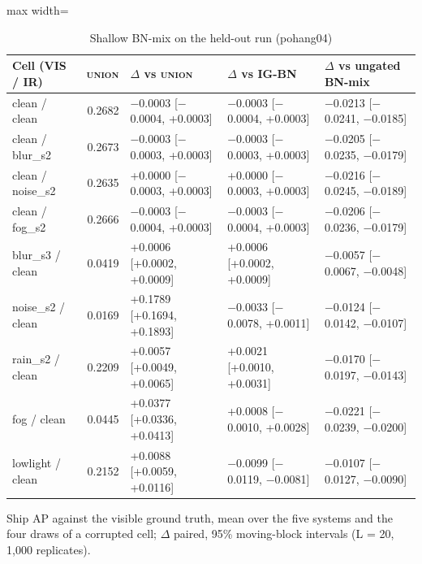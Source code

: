 \documentclass[journal,onecolumn]{IEEEtran}
\begin{document}
\begin{table}[htbp]
\centering
\small
\caption{Shallow BN-mix on the held-out run (pohang04)}
\label{tab:24}
\begin{adjustbox}{max width=\linewidth}
\begin{tabular}{lrlll}
\toprule
Cell (VIS / IR) & \textsc{union} & $\Delta$ vs \textsc{union} & $\Delta$ vs \mbox{IG-BN} & $\Delta$ vs ungated BN-mix \\
\midrule
clean / clean & 0.2682 & $-$0.0003 [$-$0.0004, +0.0003] & $-$0.0003 [$-$0.0004, +0.0003] & $-$0.0213 [$-$0.0241, $-$0.0185] \\
clean / blur\_s2 & 0.2673 & $-$0.0003 [$-$0.0003, +0.0003] & $-$0.0003 [$-$0.0003, +0.0003] & $-$0.0205 [$-$0.0235, $-$0.0179] \\
clean / noise\_s2 & 0.2635 & +0.0000 [$-$0.0003, +0.0003] & +0.0000 [$-$0.0003, +0.0003] & $-$0.0216 [$-$0.0245, $-$0.0189] \\
clean / fog\_s2 & 0.2666 & $-$0.0003 [$-$0.0004, +0.0003] & $-$0.0003 [$-$0.0004, +0.0003] & $-$0.0206 [$-$0.0236, $-$0.0179] \\
blur\_s3 / clean & 0.0419 & +0.0006 [+0.0002, +0.0009] & +0.0006 [+0.0002, +0.0009] & $-$0.0057 [$-$0.0067, $-$0.0048] \\
noise\_s2 / clean & 0.0169 & +0.1789 [+0.1694, +0.1893] & $-$0.0033 [$-$0.0078, +0.0011] & $-$0.0124 [$-$0.0142, $-$0.0107] \\
rain\_s2 / clean & 0.2209 & +0.0057 [+0.0049, +0.0065] & +0.0021 [+0.0010, +0.0031] & $-$0.0170 [$-$0.0197, $-$0.0143] \\
fog / clean & 0.0445 & +0.0377 [+0.0336, +0.0413] & +0.0008 [$-$0.0010, +0.0028] & $-$0.0221 [$-$0.0239, $-$0.0200] \\
lowlight / clean & 0.2152 & +0.0088 [+0.0059, +0.0116] & $-$0.0099 [$-$0.0119, $-$0.0081] & $-$0.0107 [$-$0.0127, $-$0.0090] \\
\bottomrule
\end{tabular}
\end{adjustbox}
\par\smallskip\raggedright\footnotesize Ship AP against the visible ground truth, mean over the five systems and the four draws of a corrupted cell; $\Delta$ paired, 95\% moving-block intervals (L = 20, 1,000 replicates).
\end{table}
\FloatBarrier
\end{document}
